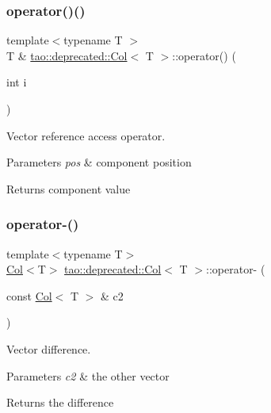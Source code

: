 \subsubsection{\texorpdfstring{operator()()}{operator()()}\hspace{0.1cm}{\footnotesize\ttfamily [2/2]}}
{\footnotesize\ttfamily template$<$typename T $>$ \\
T \& \mbox{\hyperlink{classtao_1_1deprecated_1_1_col}{tao\+::deprecated\+::\+Col}}$<$ T $>$\+::operator() (\begin{DoxyParamCaption}\item[{int}]{i }\end{DoxyParamCaption})}



Vector reference access operator. 


\begin{DoxyParams}{Parameters}
{\em pos} & component position \\
\hline
\end{DoxyParams}
\begin{DoxyReturn}{Returns}
component value 
\end{DoxyReturn}
\mbox{\label{classtao_1_1deprecated_1_1_col_a8123b7620282f28f271b7e723738a1dd}} 
\subsubsection{\texorpdfstring{operator-\/()}{operator-()}}
{\footnotesize\ttfamily template$<$typename T$>$ \\
\mbox{\hyperlink{classtao_1_1deprecated_1_1_col}{Col}}$<$T$>$ \mbox{\hyperlink{classtao_1_1deprecated_1_1_col}{tao\+::deprecated\+::\+Col}}$<$ T $>$\+::operator-\/ (\begin{DoxyParamCaption}\item[{const \mbox{\hyperlink{classtao_1_1deprecated_1_1_col}{Col}}$<$ T $>$ \&}]{c2 }\end{DoxyParamCaption})\hspace{0.3cm}{\ttfamily [inline]}}



Vector difference. 


\begin{DoxyParams}{Parameters}
{\em c2} & the other vector \\
\hline
\end{DoxyParams}
\begin{DoxyReturn}{Returns}
the difference 
\end{DoxyReturn}
\mbox{\label{classtao_1_1deprecated_1_1_col_a7efce49157e7566d092dfe665dfaefd7}} 
